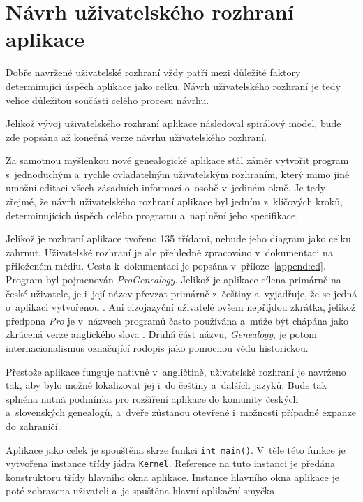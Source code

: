 	\newpage
	
	\section{Návrh uživatelského rozhraní aplikace}
	Dobře navržené uživatelské rozhraní vždy patří mezi důležité faktory determinující úspěch aplikace jako celku. Návrh uživatelského rozhraní je tedy velice důležitou součástí celého procesu návrhu. \par
	Jelikož vývoj uživatelského rozhraní aplikace následoval spirálový model, bude zde popsána až konečná verze návrhu uživatelského rozhraní.\par
	Za samotnou myšlenkou nové genealogické aplikace stál záměr vytvořit program s~jednoduchým a~rychle ovladatelným uživatelským rozhraním, který mimo jiné umožní editaci všech zásadních informací o~osobě v~jediném okně. Je tedy zřejmé, že návrh uživatelského rozhraní aplikace byl jedním z~klíčových kroků, determinujících úspěch celého programu a~naplnění jeho specifikace.\par
	Jelikož je rozhraní aplikace tvořeno 135 třídami, nebude jeho diagram jako celku zahrnut. Uživatelské rozhraní je ale přehledně zpracováno v~dokumentaci na přiloženém médiu. Cesta k~dokumentaci je popsána v~příloze~\ref{append:cd}. 
	Program byl pojmenován \emph{ProGenealogy}. Jelikož je aplikace cílena primárně na české uživatele, je i~její název převzat primárně z~češtiny a~vyjadřuje, že se jedná o~aplikaci vytvořenou . Ani cizojazyční uživatelé ovšem nepřijdou zkrátka, jelikož předpona \emph{Pro} je v~názvech programů často používána a~může být chápána jako zkrácená verze anglického slova . Druhá část názvu, \emph{Genealogy}, je potom internacionalismus označující rodopis jako pomocnou vědu historickou.\par
	Přestože aplikace funguje nativně v~angličtině, uživatelské rozhraní je navrženo tak, aby bylo možné lokalizovat jej i~do češtiny a~dalších jazyků. Bude tak splněna nutná podmínka pro rozšíření aplikace do komunity českých a~slovenských genealogů, a~dveře zůstanou otevřené i~možnosti případné expanze do zahraničí.\par
	Aplikace jako celek je spouštěna skrze funkci \texttt{int main()}. V~těle této funkce je vytvořena instance třídy jádra \texttt{Kernel}. Reference na tuto instanci je předána konstruktoru třídy hlavního okna aplikace. Instance hlavního okna aplikace je poté zobrazena uživateli a~je spuštěna hlavní aplikační smyčka.\par
	
